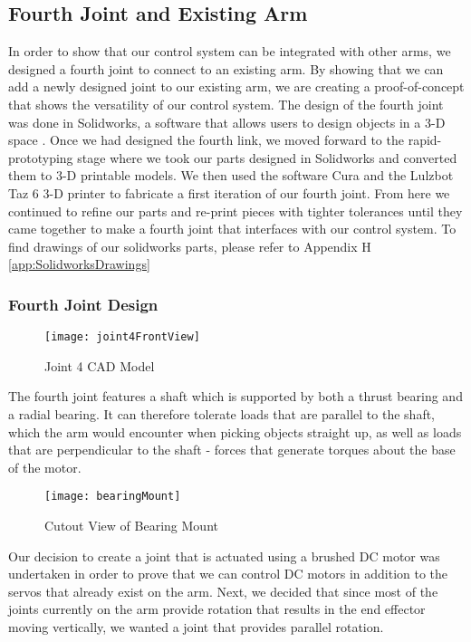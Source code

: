 \subsection{Fourth Joint and Existing Arm}
In order to show that our control system can be integrated with other arms, we designed a fourth joint to connect to an existing arm. By showing that we can add a newly designed joint to our existing arm, we are creating a proof-of-concept that shows the versatility of our control system.  The design of the fourth joint was done in Solidworks, a software that allows users to design objects in a 3-D space \cite{Solidworks}. Once we had designed the fourth link, we moved forward to the rapid-prototyping stage where we took our parts designed in Solidworks and converted them to 3-D printable models.  We then used the software Cura \cite{Cura} and the Lulzbot Taz 6 3-D printer \cite{Taz6} to fabricate a first iteration of our fourth joint.  From here we continued to refine our parts and re-print pieces with tighter tolerances until they came together to make a fourth joint that interfaces with our control system. To find drawings of our solidworks parts, please refer to Appendix H \ref{app:SolidworksDrawings}

\subsubsection{Fourth Joint Design}

\begin{figure}[H]
	\centering
	\texttt{[image: joint4FrontView]}
	\caption{Joint 4 CAD Model}
	\label{fig:Joint 4 CAD Model}
\end{figure}

The fourth joint features a shaft which is supported by both a thrust bearing and a radial bearing. It can therefore tolerate loads that are parallel to the shaft, which the arm would encounter when picking objects straight up, as well as loads that are perpendicular to the shaft - forces that generate torques about the base of the motor.\\


\begin{figure}[H]
	\centering
	\texttt{[image: bearingMount]}
	\caption{Cutout View of Bearing Mount}
	\label{Cutout View of Bearing Mount}
\end{figure}


\noindent Our decision to create a joint that is actuated using a brushed DC motor was undertaken in order to prove that we can control DC motors in addition to the servos that already exist on the arm.  Next, we decided that since most of the joints currently on the arm provide rotation that results in the end effector moving vertically, we wanted a joint that provides parallel rotation. \\


